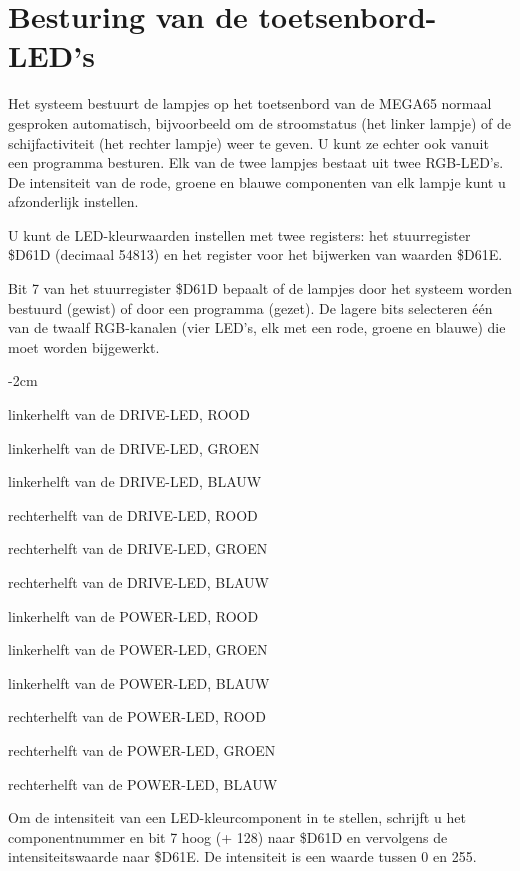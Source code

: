 \section{Besturing van de toetsenbord-LED's}

Het systeem bestuurt de lampjes op het toetsenbord van de MEGA65 normaal gesproken automatisch, bijvoorbeeld om de stroomstatus (het linker lampje) of de schijfactiviteit (het rechter lampje) weer te geven. U kunt ze echter ook vanuit een programma besturen. Elk van de twee lampjes bestaat uit twee RGB-LED's. De intensiteit van de rode, groene en blauwe componenten van elk lampje kunt u afzonderlijk instellen.

U kunt de LED-kleurwaarden instellen met twee registers: het stuurregister \$D61D (decimaal 54813) en het register voor het bijwerken van waarden \$D61E.

Bit 7 van het stuurregister \$D61D bepaalt of de lampjes door het systeem worden bestuurd (gewist) of door een programma (gezet). De lagere bits selecteren één van de twaalf RGB-kanalen (vier LED's, elk met een rode, groene en blauwe) die moet worden bijgewerkt.

\begin{adjustwidth}{}{-2cm}
\begin{description}[align=left,labelwidth=0.2cm]
\item[ 0] linkerhelft van de DRIVE-LED, ROOD\item[ 1] linkerhelft van de DRIVE-LED, GROEN\item[ 2] linkerhelft van de DRIVE-LED, BLAUW\item[ 3] rechterhelft van de DRIVE-LED, ROOD\item[ 4] rechterhelft van de DRIVE-LED, GROEN\item[ 5] rechterhelft van de DRIVE-LED, BLAUW\item[ 6] linkerhelft van de POWER-LED, ROOD\item[ 7] linkerhelft van de POWER-LED, GROEN\item[ 8] linkerhelft van de POWER-LED, BLAUW\item[ 9] rechterhelft van de POWER-LED, ROOD\item[10] rechterhelft van de POWER-LED, GROEN\item[11] rechterhelft van de POWER-LED, BLAUW
\end{description}
\end{adjustwidth}

Om de intensiteit van een LED-kleurcomponent in te stellen, schrijft u het componentnummer en bit 7 hoog (+ 128) naar \$D61D en vervolgens de intensiteitswaarde naar \$D61E. De intensiteit is een waarde tussen 0 en 255.

